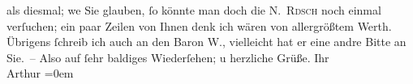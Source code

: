 \begin{ledgroupsized}[t]{13cm}
                    als diesmal; we{\geminationn} Sie glauben, ſo könnte man doch
                    die \textsc{N. Rdsch} noch einmal {\pb}verſuchen; ein paar Zeilen von
                    Ihnen denk ich wären von allergrößtem Werth. Übrigens ſchreib ich auch an den
                    Baron W., vielleicht hat er eine andre Bitte
                    an Sie. –\pend
           \pstart
           Also auf ſehr baldiges Wiederſehen; u herzliche Grüße.\pend
           \pstart
           Ihr{\\[\baselineskip]}\spacefill\mbox{Arthur}\pend
           \leftskip=0em{}
         
         \endnumbering{}\end{ledgroupsized}  \newcommand{\dateiname}{L01809}\newcommand{\titel}{Arthur Schnitzler an Hugo von Hofmannsthal, 26. 11. 1908}\newcommand{\editorInnen}{ Martin Anton Müller und Gerd-Hermann Susen}
      